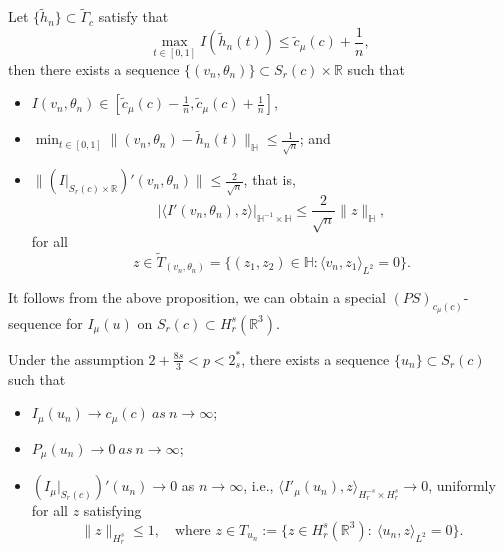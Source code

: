 \begin{lemma}\label{lem5.4} 
Let $\{\tilde{h}_n\}\subset \tilde{\Gamma}_c $ satisfy that
$$
\max_{t\in[0,1]}I(\tilde{h}_n(t))\leq \tilde{c}_\mu (c)+\frac{1}{n},
$$
then there exists a sequence $\{(v_n, \theta_n)\}\subset S_{r}(c)\times \mathbb{R}$ 
such that
\begin{itemize}
\item[(i)] $I{(v_n, \theta_n)}\in [\tilde{c}_\mu (c)-\frac{1}{n}, 
 \tilde{c}_\mu (c)+\frac{1}{n}]$,
 
\item[(ii)] $\min_{t\in[0,1]}\|(v_n, \theta_n)-\tilde{h}_n(t)\|_{\mathbb{H}}
\leq \frac{1}{\sqrt{n}}$; and

\item[(iii)] $\|(I|_{S_{r}(c)\times \mathbb{R}})'(v_n, \theta_n)\|
 \leq \frac{2}{\sqrt{n}}$, that is,
$$
|\langle I'(v_n, \theta_n), z\rangle|_{\mathbb{H}^{-1}\times \mathbb{H}}
\leq \frac{2}{\sqrt{n}} \|z\|_{\mathbb{H}},
$$
for all
$$ 
{z\in {\tilde{T}_{(v_n, \theta_n)}}}=\{(z_1, z_2)\in \mathbb{H}: 
{\langle v_n, z_1\rangle}_{L^2}=0\}.
$$
\end{itemize}
\end{lemma}


It follows from the above proposition, we can obtain a special 
$(PS)_{{c}_\mu (c)}$-sequence for $I_\mu(u)$ on $S_{r}(c)\subset H^s_r(\mathbb{R}^3)$.

\begin{lemma}\label{lem5.5} 
Under the  assumption $2+\frac{8s}{3}<p<2^*_s$, there exists a sequence
$\{u_n\} \subset S_{r}(c)$ such that
\begin{itemize}
\item[(1)] $I_\mu(u_n)\to c_\mu(c) ~as~ n\to \infty$;

\item[(2)] $P_\mu(u_n)\to 0 ~as~ n\to \infty$;

\item[(3)] $(I_\mu|_{S_{r}(c)})'(u_n)\to 0$  as $n\to \infty$, i.e., 
$\langle I'_\mu(u_n), z\rangle_{{H^{-s}_r} \times H^s_r} \to 0$, 
uniformly for all $z$ satisfying
$$
\|z\|_{H^s_r}\leq 1,\quad \text{where } z\in T_{u_n} 
:=\{z\in {H^s_r(\mathbb{R}^3)}:~\langle u_n,z \rangle_{L^2}=0\}.
$$
\end{itemize}
\end{lemma}

